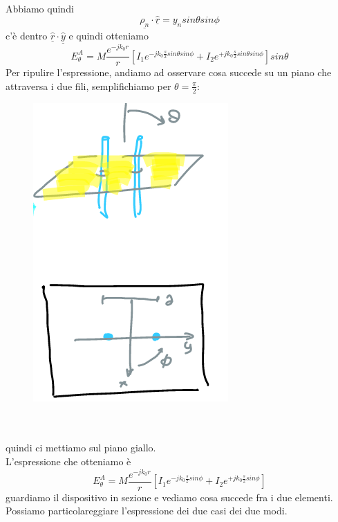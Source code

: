 \documentclass[oneside, 12pt]{extbook}
\begin{document}
Abbiamo quindi
\begin{equation}
	\underline{\rho_n}\cdot \hat{\underline{r}} = y_n sin\theta sin\phi
\end{equation}
c'è dentro $\hat{\underline{r}} \cdot \hat{\underline{y}}$ e quindi otteniamo
\begin{equation}
	E_{\theta}^A = M \dfrac{e^{-jk_0r}}{r} [I_1 e^{-jk_0\frac{s}{2}sin\theta sin\phi} + I_2e^{+jk_0\frac{s}{2}sin\theta sin\phi}]sin\theta
\end{equation}
Per ripulire l'espressione, andiamo ad osservare cosa succede su un piano che attraversa i due fili, semplifichiamo per $\theta = \frac{\pi}{2}$:\\
\begin{figure}[!h]
	\includegraphics[scale=0.3]{immagini/sez_fili.png}
\end{figure}
\\\\quindi ci mettiamo sul piano giallo.\\L'espressione che otteniamo è 
\begin{equation}
	E_{\theta}^A = M \dfrac{e^{-jk_0r}}{r} [I_1 e^{-jk_0\frac{s}{2}sin\phi} + I_2e^{+jk_0\frac{s}{2}sin\phi}]
\end{equation}
guardiamo il dispositivo in sezione e vediamo cosa succede fra i due elementi.\\Possiamo particolareggiare l'espressione dei due casi dei due modi.
\end{document}
